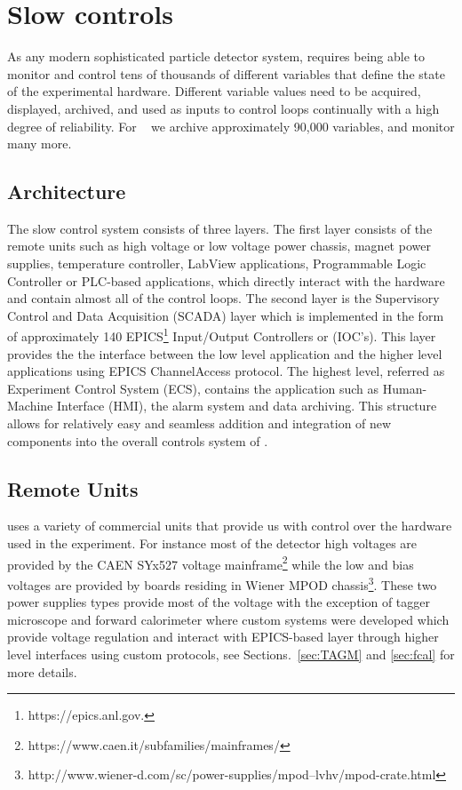 
\section[Slow controls]{Slow controls \label{sec:controls}}
As any modern sophisticated particle detector system, \gx{} requires being able to monitor 
and control tens of thousands of different variables that define the state of the experimental hardware. Different variable values need to be acquired, displayed, archived, and used as inputs to control loops continually with a high degree of reliability. For \gx~ we archive approximately 90,000 variables, and monitor many more.

\subsection{Architecture \label{sec:controlsarchitechture}}
The \gx{} slow control system consists of three layers. The first layer consists of the remote units such as high voltage or low voltage power chassis, magnet power supplies, temperature controller, LabView applications, Programmable Logic Controller or PLC-based applications, which directly interact with the hardware and contain almost all of the control loops. The second layer is the Supervisory Control and Data Acquisition (SCADA) layer which is implemented in the form of approximately 140 EPICS\footnote{https://epics.anl.gov.} Input/Output Controllers or (IOC's). This layer provides the the interface between the low level application and the higher level applications using EPICS ChannelAccess protocol. The highest level, referred as Experiment Control System (ECS), contains the application such as Human-Machine Interface (HMI), the alarm system and data archiving. This structure allows for relatively easy and seamless addition and integration of new components into the overall controls system of \gx{}.    

\subsection{Remote Units \label{sec:controlsinterface}}
\gx{} uses a variety of commercial units that provide us with control over the hardware used in the experiment. For instance most of the detector high voltages are provided by the CAEN SYx527 voltage mainframe\footnote{https://www.caen.it/subfamilies/mainframes/} while the low and bias voltages are provided by boards residing in Wiener MPOD chassis\footnote{http://www.wiener-d.com/sc/power-supplies/mpod--lvhv/mpod-crate.html}. These two power supplies types provide most of the voltage with the exception of tagger microscope and forward calorimeter where custom systems were developed which provide voltage regulation and interact with EPICS-based layer through higher level interfaces using custom protocols, see Sections.~\ref{sec:TAGM} and \ref{sec:fcal} for more details.  

